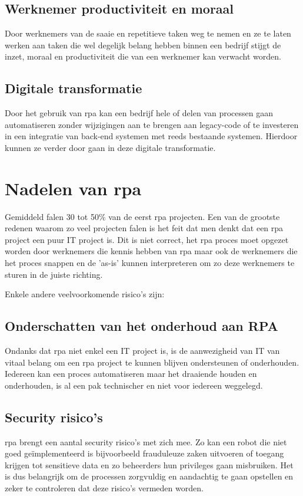 \subsection{Werknemer productiviteit en moraal}
Door werknemers van de saaie en repetitieve taken weg te nemen en ze te laten werken aan taken die wel degelijk belang hebben binnen een bedrijf stijgt de inzet, moraal en productiviteit die van een werknemer kan verwacht worden. \autocite{efficiencyRPA}

\subsection{Digitale transformatie}
Door het gebruik van \acrshort{rpa} kan een bedrijf hele of delen van processen gaan automatiseren zonder wijzigingen aan te brengen aan legacy-code of te investeren in een integratie van back-end systemen met reeds bestaande systemen. Hierdoor kunnen ze verder door gaan in deze digitale transformatie. \autocite{efficiencyRPA}

\section{Nadelen van \acrshort{rpa}}
Gemiddeld falen 30 tot 50\% van de eerst \acrshort{rpa} projecten. \autocite{everythingRPA} Een van de grootste redenen waarom zo veel projecten falen is het feit dat men denkt dat een \acrshort{rpa} project een puur IT project is. Dit is niet correct, het \acrshort{rpa} proces moet opgezet worden door werknemers die kennis hebben van \acrshort{rpa} maar ook de werknemers die het proces snappen en de 'as-is' kunnen interpreteren om zo deze werknemers te sturen in de juiste richting.

Enkele andere veelvoorkomende risico's zijn:

\subsection{Onderschatten van het onderhoud aan RPA}
Ondanks dat \acrshort{rpa} niet enkel een IT project is, is de aanwezigheid van IT van vitaal belang om een \acrshort{rpa} project te kunnen blijven ondersteunen of onderhouden. Iedereen kan een proces automatiseren maar het draaiende houden en onderhouden, is al een pak technischer en niet voor iedereen weggelegd. \autocite{everythingRPA}

\subsection{Security risico's}
\acrshort{rpa} brengt een aantal security risico's met zich mee. Zo kan een robot die niet goed geïmplementeerd is bijvoorbeeld frauduleuze zaken uitvoeren of toegang krijgen tot sensitieve data en zo beheerders hun privileges gaan misbruiken. Het is dus belangrijk om de processen zorgvuldig en aandachtig te gaan opstellen en zeker te controleren dat deze risico's vermeden worden. \autocite{everythingRPA} \autocite{predictionRPA}

